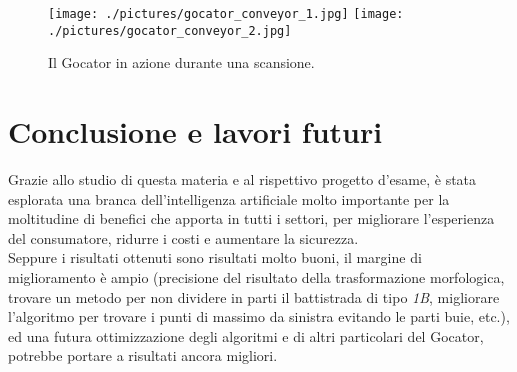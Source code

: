 \begin{figure}[H]
	\centering
	\texttt{[image: ./pictures/gocator\_conveyor\_1.jpg]}
	\hspace{1em}
	\texttt{[image: ./pictures/gocator\_conveyor\_2.jpg]}
	\caption{Il Gocator in azione durante una scansione.}\label{fig:gocator_conveyor}
\end{figure}

\section{Conclusione e lavori futuri}
Grazie allo studio di questa materia e al rispettivo progetto d'esame, è stata esplorata una branca dell'intelligenza artificiale molto importante per la moltitudine di benefici che apporta in tutti i settori, per migliorare l'esperienza del consumatore, ridurre i costi e aumentare la sicurezza.\\
\newline
Seppure i risultati ottenuti sono risultati molto buoni, il margine di miglioramento è ampio (precisione del risultato della trasformazione morfologica, trovare un metodo per non dividere in parti il battistrada di tipo \textit{1B}, migliorare l'algoritmo per trovare i punti di massimo da sinistra evitando le parti buie, etc.), ed una futura ottimizzazione degli algoritmi e di altri particolari del Gocator, potrebbe portare a risultati ancora migliori.

\nocite{opencv_library}
\nocite{helix_toolkit_documentation}
\nocite{wpf_whatis}
\nocite{wrapping_whatis}
\nocite{dll_whatis}
\nocite{direct_industry}
\nocite{redazione_geomedia}
\nocite{lmi_technologies}
\nocite{image_s_blog}
\nocite{point_cloud_library_1}
\nocite{point_cloud_library_2}
\nocite{point_cloud_library_3}
\nocite{point_cloud_library_4}
\nocite{the_gsl_team}
\nocite{wang2019}
\nocite{booksdaglib0034531}
\nocite{gonzalez2008digital}
\nocite{named_pipe_whatis}